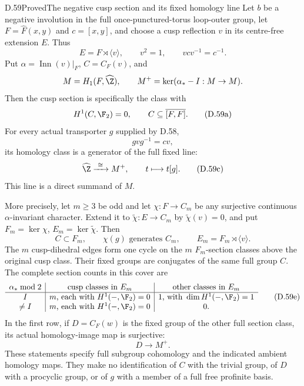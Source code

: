 \begin{claim}{D.59}{Proved}{The negative cusp section and its fixed homology line}
Let $b$ be a negative involution in the full
once-punctured-torus loop-outer group, let
$F=\widehat F(x,y)$ and $c=[x,y]$, and choose a
cusp reflection $v$ in its centre-free extension $E$.
Thus
\[
 E=F\rtimes\langle v\rangle,\qquad
 v^2=1,\qquad vcv^{-1}=c^{-1}.
\]
Put $\alpha=\operatorname{Inn}(v)|_F$,
$C=C_F(v)$, and
\[
 M=H_1(F,\widehat\Z),\qquad
 M^+=\ker(\alpha_*-I:M\to M).
\]
Then the cusp section is specifically the class with
\[
             H^1(C,\F_2)=0,\qquad C\subseteq\overline{[F,F]}.
                                                        \tag{D.59a}
\]
For every actual transporter $g$ supplied by D.58,
\[
                    gvg^{-1}=cv,
                                                        \tag{D.59b}
\]
its homology class is a generator of the full fixed
line:
\[
 \widehat\Z\xrightarrow{\ \cong\ }M^+,\qquad
                         t\longmapsto t[g].
                                                        \tag{D.59c}
\]
This line is a direct summand of $M$.

More precisely, let $m\geq3$ be odd and let
$\chi:F\to C_m$ be any surjective continuous
$\alpha$-invariant character. Extend it to
$\widetilde\chi:E\to C_m$ by
$\widetilde\chi(v)=0$, and put
$F_m=\ker\chi$, $E_m=\ker\widetilde\chi$.
Then
\[
 C\subset F_m,\qquad
 \chi(g)\text{ generates }C_m,\qquad
 E_m=F_m\rtimes\langle v\rangle .
                                                        \tag{D.59d}
\]
The $m$ cusp-dihedral edges form one cycle on the
$m$ $F_m$-section classes above the original cusp
class. Their fixed groups are conjugates of the
same full group $C$.
The complete section counts in this cover are
\[
\begin{array}{c|c|c}
 \alpha_*\bmod2&
 \text{cusp classes in }E_m&
 \text{other classes in }E_m\\ \hline
 I&m\text{, each with }H^1(-,\F_2)=0&
 1\text{, with }\dim H^1(-,\F_2)=1\\
 \ne I&m\text{, each with }H^1(-,\F_2)=0&0 .
\end{array}                                             \tag{D.59e}
\]
In the first row, if $D=C_F(w)$ is the fixed group
of the other full section class, its actual
homology-image map is surjective:
\[
                         D\longrightarrow M^+ .
                                                        \tag{D.59f}
\]
These statements specify full subgroup cohomology
and the indicated ambient homology maps. They make
no identification of $C$ with the trivial group,
of $D$ with a procyclic group, or of $g$ with a member
of a full free profinite basis.
\end{claim}

